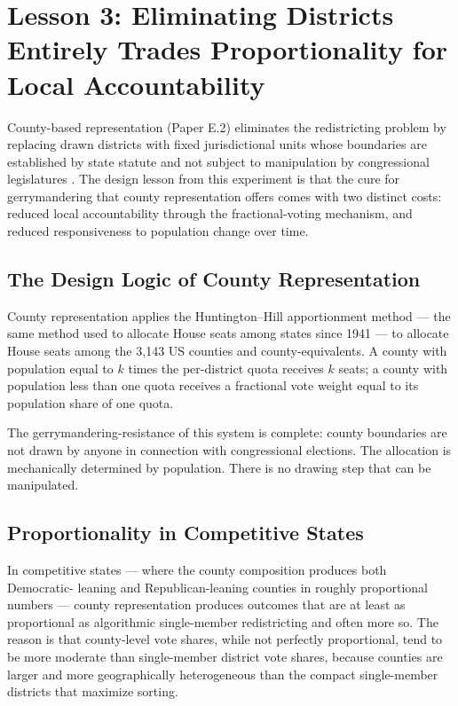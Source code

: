 \section{Lesson 3: Eliminating Districts Entirely Trades Proportionality for Local Accountability}
\label{sec:lesson3}

County-based representation (Paper E.2) eliminates the redistricting problem
by replacing drawn districts with fixed jurisdictional units whose boundaries
are established by state statute and not subject to manipulation by
congressional legislatures \citep{dellaLibera2026e2}.  The design lesson from
this experiment is that the cure for gerrymandering that county representation
offers comes with two distinct costs: reduced local accountability through the
fractional-voting mechanism, and reduced responsiveness to population change
over time.

\subsection{The Design Logic of County Representation}

County representation applies the Huntington--Hill apportionment method ---
the same method used to allocate House seats among states since 1941
\citep{balinski2001fair} --- to allocate House seats among the 3,143 US
counties and county-equivalents.  A county with population equal to $k$ times
the per-district quota receives $k$ seats; a county with population less than
one quota receives a fractional vote weight equal to its population share
of one quota.

The gerrymandering-resistance of this system is complete: county boundaries
are not drawn by anyone in connection with congressional elections.  The
allocation is mechanically determined by population.  There is no drawing
step that can be manipulated.

\subsection{Proportionality in Competitive States}

In competitive states --- where the county composition produces both Democratic-
leaning and Republican-leaning counties in roughly proportional numbers ---
county representation produces outcomes that are at least as proportional as
algorithmic single-member redistricting and often more so.  The reason is that
county-level vote shares, while not perfectly proportional, tend to be more
moderate than single-member district vote shares, because counties are larger
and more geographically heterogeneous than the compact single-member districts
that maximize sorting.

